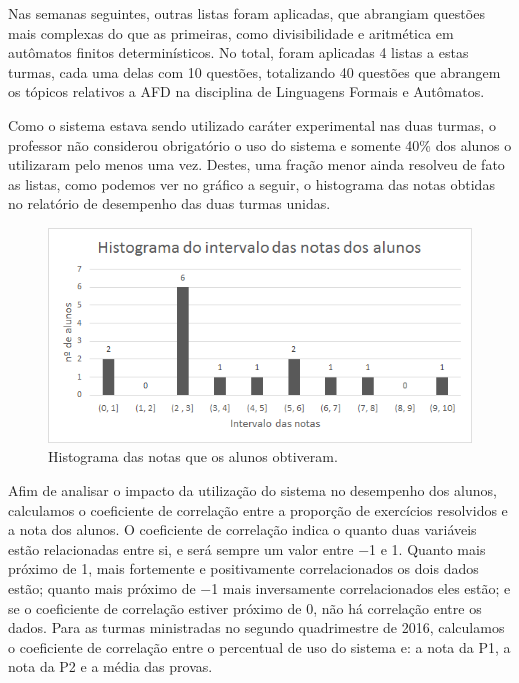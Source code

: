 \documentclass[
	12pt,				%
	openany,
	oneside,
	a4paper,			%
	english,			%
	brazil				%
	]{abntex2}
\begin{document}
  Nas semanas seguintes, outras listas foram aplicadas, que abrangiam questões mais complexas do que as primeiras, como divisibilidade e aritmética em autômatos finitos determinísticos. No total, foram aplicadas 4 listas a estas turmas, cada uma delas com 10 questões, totalizando 40 questões que abrangem os tópicos relativos a AFD na disciplina de Linguagens Formais e Autômatos.

  Como o sistema estava sendo utilizado caráter experimental nas duas turmas, o professor não considerou obrigatório o uso do sistema e somente 40\% dos alunos o utilizaram pelo menos uma vez. Destes, uma fração menor ainda resolveu de fato as listas, como podemos ver no gráfico a seguir, o histograma das notas obtidas no relatório de desempenho das duas turmas unidas.

\begin{figure}[H]
  \centering
  \includegraphics[scale=0.8]{histNotas.png}
  \caption{Histograma das notas que os alunos obtiveram.}
  \label{print:histNotas}
\end{figure}  
  
  Afim de analisar o impacto da utilização do sistema no desempenho dos alunos, calculamos o coeficiente de correlação entre a proporção de exercícios resolvidos e a nota dos alunos. O coeficiente de correlação indica o quanto duas variáveis estão relacionadas entre si, e será sempre um valor entre $-$1 e 1. Quanto mais próximo de 1, mais fortemente e positivamente correlacionados os dois dados estão; quanto mais próximo de $-$1 mais inversamente correlacionados eles estão; e se o coeficiente de correlação estiver próximo de 0, não há correlação entre os dados. Para as turmas ministradas no segundo quadrimestre de 2016, calculamos o coeficiente de correlação entre o percentual de uso do sistema e: a nota da P1, a nota da P2 e a média das provas. 
  
\end{document}
